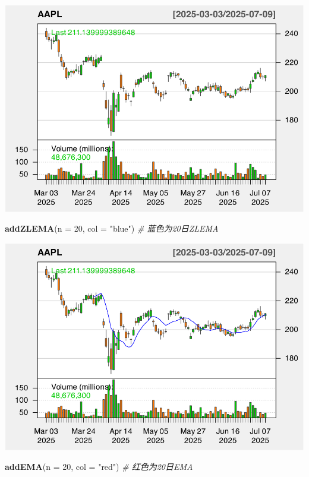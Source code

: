 \documentclass[]{ctexbook}
\newenvironment{Shaded}{\begin{snugshade}}{\end{snugshade}}
\newcommand{\AttributeTok}[1]{\textcolor[rgb]{0.13,0.29,0.53}{#1}}
\newcommand{\CommentTok}[1]{\textcolor[rgb]{0.56,0.35,0.01}{\textit{#1}}}
\newcommand{\DecValTok}[1]{\textcolor[rgb]{0.00,0.00,0.81}{#1}}
\newcommand{\FunctionTok}[1]{\textcolor[rgb]{0.13,0.29,0.53}{\textbf{#1}}}
\newcommand{\NormalTok}[1]{#1}
\newcommand{\StringTok}[1]{\textcolor[rgb]{0.31,0.60,0.02}{#1}}
\begin{document}
\includegraphics[width=0.9\linewidth]{quantmod_files/figure-latex/zlema_2-1}

\begin{Shaded}
\begin{Highlighting}[]
\FunctionTok{addZLEMA}\NormalTok{(}\AttributeTok{n =} \DecValTok{20}\NormalTok{, }\AttributeTok{col =} \StringTok{"blue"}\NormalTok{)   }\CommentTok{\# 蓝色为20日ZLEMA}
\end{Highlighting}
\end{Shaded}

\includegraphics[width=0.9\linewidth]{quantmod_files/figure-latex/zlema_2-2}

\begin{Shaded}
\begin{Highlighting}[]
\FunctionTok{addEMA}\NormalTok{(}\AttributeTok{n =} \DecValTok{20}\NormalTok{, }\AttributeTok{col =} \StringTok{"red"}\NormalTok{)      }\CommentTok{\# 红色为20日EMA}
\end{Highlighting}
\end{Shaded}
\end{document}
